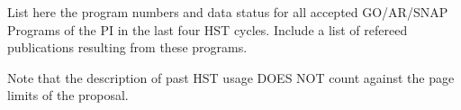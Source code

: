 \documentclass[12pt]{article}
\begin{document}
%
%
%
\pasthstusage  %

    List here the program numbers and data status for all accepted GO/AR/SNAP Programs of the PI in the last four HST cycles. Include a list of refereed publications resulting from these programs.
       
    Note that the description of past HST usage DOES NOT count against the page limits of the proposal.


\end{document}
